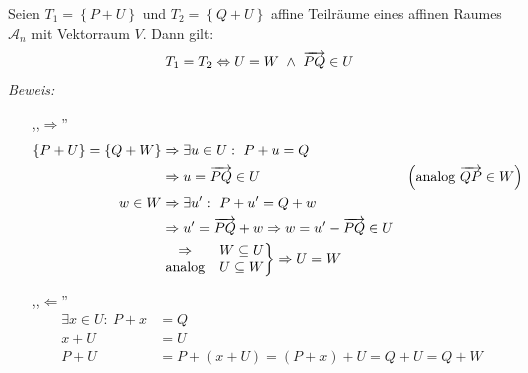 \begin{mysatz}

    Seien $T_1 = \left\{ P+U \right\}$ und $T_2 = \left\{ Q+U \right\}$ affine Teilräume eines affinen Raumes $\mathcal{A}_n$ mit Vektorraum $V$. Dann gilt:
    \begin{align*}
        T_1 = T_2 \Leftrightarrow U = W \ \wedge \ \overrightarrow{PQ} \in U
    \end{align*}
    \textit{Beweis:}
    \begin{itemize}
        \item[,,$\Rightarrow$'']
            \begin{align*}
                \left\{ P + U \right\} = \left\{ Q + W \right\} & \Rightarrow \exists u \in U:\ P + u = Q\\
                & \Rightarrow u = \overrightarrow{PQ} \in U & \left( \text{analog } \overrightarrow{QP} \in W \right)\\
                w \in W & \Rightarrow \exists u':\ P + u' = Q + w\\
                & \Rightarrow u' = \overrightarrow{PQ} + w \Rightarrow w = u' - \overrightarrow{PQ} \in U\\
                & \left.
                \begin{matrix}
                    \Rightarrow & W \subseteq U\\
                    \text{analog} & U \subseteq W
                \end{matrix}
                \right\} \Rightarrow U = W
            \end{align*}
        \item[,,$\Leftarrow$'']
            \begin{align*}
                \exists x \in U:\ P + x & = Q\\
                x + U & = U\\
                P + U & = P + \left( x + U \right) = \left( P + x \right) + U = Q + U = Q + W
            \end{align*}
    \end{itemize}
\end{mysatz}

